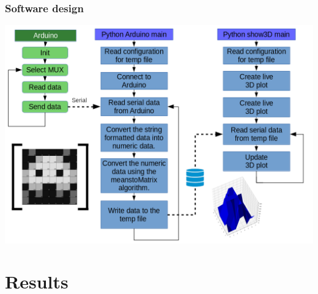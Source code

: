 \documentclass{beamer}
\begin{document}
\begin{frame}
    \frametitle{Software design}
    \begin{center}
        \includegraphics[width=.8\textwidth]{img/software_design.png}
    \end{center}

\end{frame}

\section{Results}%
\label{sec:results}
\end{document}
